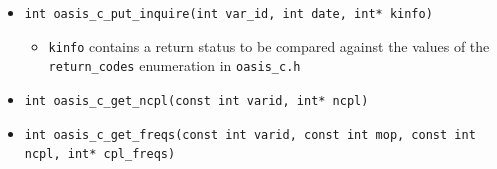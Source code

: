 \begin{itemize}
\vspace{0.2cm}
\item {\tt int oasis\_c\_put\_inquire(int var\_id, int date, int* kinfo)}
  \begin{itemize}
  \item {\tt kinfo} contains a return status to be compared against
    the values of the {\tt return\_codes} enumeration in {\tt oasis\_c.h}
  \end{itemize}

\vspace{0.2cm}
\item {\tt int oasis\_c\_get\_ncpl(const int varid, int* ncpl)}

\vspace{0.2cm}
\item {\tt int oasis\_c\_get\_freqs(const int varid, const int mop, const int ncpl, int*  cpl\_freqs)}

\end{itemize}
